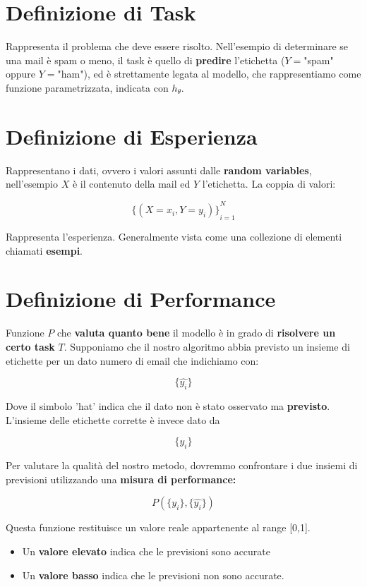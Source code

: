 \section{Definizione di Task}

Rappresenta il problema che deve essere risolto. Nell'esempio di determinare se una mail è spam o meno, il task è quello di \textbf{predire} l'etichetta ($Y=$"spam" oppure $Y=$"ham"), ed è strettamente legata al modello, che rappresentiamo come funzione parametrizzata, indicata con $h_\theta$.

\section{Definizione di Esperienza}

Rappresentano i dati, ovvero i valori assunti dalle \textbf{random variables}, nell'esempio $X$ è il contenuto della mail ed $Y$ l'etichetta. La coppia di valori:

$$
  {\{(X=x_i, Y=y_i)\}}_{i=1}^N
$$

\noindent
Rappresenta l'esperienza. Generalmente vista come una collezione di elementi chiamati \textbf{esempi}.

\section{Definizione di Performance}

Funzione $P$ che \textbf{valuta quanto bene } il modello è in grado di \textbf{risolvere un certo task} $T$.
Supponiamo che il nostro algoritmo abbia previsto un insieme di etichette per un dato numero di email che indichiamo con:

$$ \{\hat{y_i}\} $$


Dove il simbolo 'hat' indica che il dato non è stato osservato ma \textbf{previsto}. L'insieme delle etichette corrette è invece dato da

$$ \{{y_i}\} $$


Per valutare la qualità del nostro metodo, dovremmo confrontare i due insiemi di previsioni utilizzando una \textbf{misura di performance:}

$$ P(\{{y_i}\},\{\hat{y_i}\} ) $$

\noindent
Questa funzione restituisce un valore reale appartenente al range [0,1].

\begin{itemize}
\item Un \textbf{valore elevato} indica che le previsioni sono accurate
\item Un \textbf{valore basso} indica che le previsioni non sono accurate.
\end{itemize}

